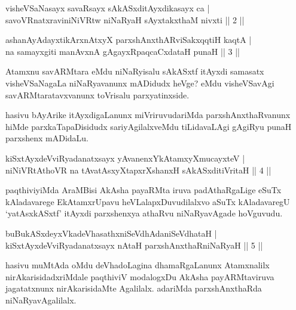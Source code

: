 \begin{shl}
visheVSaNasayx savaRsayx sAkASxditAyxdikasayx ca |\\
savoVRnatxraviniNiVRtw niNaRyaH sAyxtakxthaM nivxti \hfill || 2 ||
\end{shl}

\begin{shl}
ashanAyAdayxtikArxnAtxyX parxshAnxthARviSakxqqtiH kaqtA |\\
na samayxgiti manAvxnA gAgayxRpaqcaCxdataH punaH \hfill || 3 ||
\end{shl}

\begin{artha}
Atamxnu savARMtara eMdu niNaRyisalu sAkASxtf itAyxdi samasatx visheVSaNa\-gaLa niNaRyavanunx mADidudx heVge? eMdu visheVSavAgi savARMtaratavxvanunx toVrisalu parxyatinxside.

hasivu bAyArike itAyxdigaLanunx miVriruvudariMda parxshAnxthaRvanunx hiMde parxkaTapaDisidudx sariyAgilalxveMdu tiLidavaLAgi gAgiRyu punaH parxshenx mADidaLu.
\end{artha}


\begin{shl}
kiSxtAyxdeVviRyadanatxsayx yAvanenxYkAtamxyXmucayxteV |\\
niNiVRtAthoVR na tAvatAsxyXtapxrXshanxH sAkASxditiVritaH \hfill || 4 ||
\end{shl}

\begin{artha}
paqthiviyiMda AraMBisi AkAsha payaRMta iruva padAthaRgaLige eSuTx kAlada\-varege EkAtamxrUpavu heVLalapxDuvudilalxvo aSuTx kAladavaregU `yatAsxkASxtf' itAyxdi parxshenxya athaRvu niNaRyavAgade hoVguvudu.
\end{artha}

\begin{shl}
buBukASxdeyxVkadeVhasathxniSeVdhAdaniSeVdhataH |\\
kiSxtAyxdeVviRyadanatxsayx nAtaH parxshAnxthaRniNaRyaH \hfill || 5 ||
\end{shl}

\begin{artha}%
hasivu muMtAda oMdu deVhadoLagina dhamaRgaLanunx Atamxnalilx nirAkarisidadx\-riMdale paqthiviV modalogxDu AkAsha payARMtaviruva jagatatxnunx nirAkarisidaMte Agalilalx. adariMda parxshAnxthaRda niNaRyavAgalilalx.
\end{artha}

